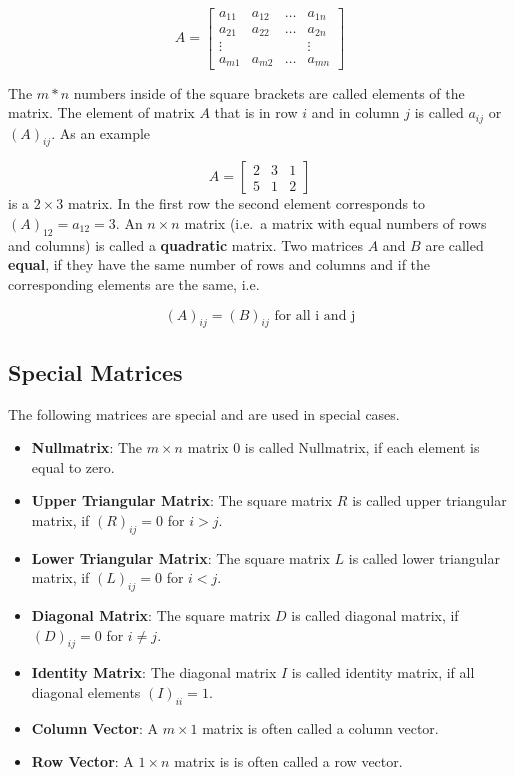 \documentclass[]{book}
\providecommand{\tightlist}{%
  \setlength{\itemsep}{0pt}\setlength{\parskip}{0pt}}
\theoremstyle{definition}
\theoremstyle{definition}
\theoremstyle{definition}
\theoremstyle{remark}
\begin{document}
\[
A = \left[
\begin{array}{cccc}
a_{11}  &  a_{12} &  \ldots  &  a_{1n} \\
a_{21}  &  a_{22} &  \ldots  &  a_{2n} \\
\vdots  &         &          &  \vdots \\
a_{m1}  &  a_{m2} &  \ldots  &  a_{mn}
\end{array}
\right]
\]

The \(m*n\) numbers inside of the square brackets are called elements of the matrix. The element of matrix \(A\) that is in row \(i\) and in column \(j\) is called \(a_{ij}\) or \((A)_{ij}\). As an example

\[
A =  \left[
\begin{array}{ccc}
2  &  3  &  1  \\
5  &  1  &  2
\end{array}
\right]
\]
is a \(2 \times 3\) matrix. In the first row the second element corresponds to \((A)_{12} = a_{12} = 3\). An \(n\times n\) matrix (i.e.~a matrix with equal numbers of rows and columns) is called a \textbf{quadratic} matrix. Two matrices \(A\) and \(B\) are called \textbf{equal}, if they have the same number of rows and columns and if the corresponding elements are the same, i.e.

\[
(A)_{ij} = (B)_{ij} \text{ for all i and j}
\]

\hypertarget{intro-linalg-special-matrices}{%
\subsection{Special Matrices}\label{intro-linalg-special-matrices}}

The following matrices are special and are used in special cases.

\begin{itemize}
\tightlist
\item
  \textbf{Nullmatrix}: The \(m\times n\) matrix \(0\) is called Nullmatrix, if each element is equal to zero.
\item
  \textbf{Upper Triangular Matrix}: The square matrix \(R\) is called upper triangular matrix, if \((R)_{ij} = 0\) for \(i>j\).
\item
  \textbf{Lower Triangular Matrix}: The square matrix \(L\) is called lower triangular matrix, if \((L)_{ij} = 0\) for \(i<j\).
\item
  \textbf{Diagonal Matrix}: The square matrix \(D\) is called diagonal matrix, if \((D)_{ij} = 0\) for \(i\ne j\).
\item
  \textbf{Identity Matrix}: The diagonal matrix \(I\) is called identity matrix, if all diagonal elements \((I)_{ii} = 1\).
\item
  \textbf{Column Vector}: A \(m\times 1\) matrix is often called a column vector.
\item
  \textbf{Row Vector}: A \(1\times n\) matrix is is often called a row vector.
\end{itemize}
\end{document}
